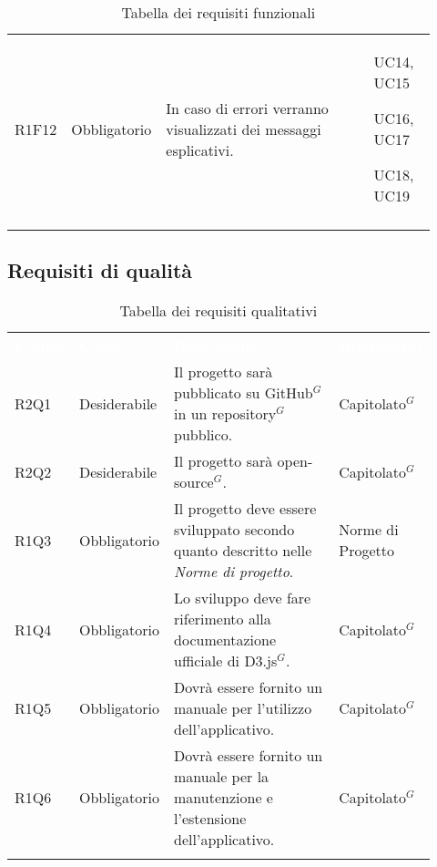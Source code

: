 {\begin{longtable}{p{0.12\linewidth}p{0.15\linewidth}p{0.50\linewidth}p{0.15\linewidth}}
    \rowcolor[RGB]{216, 235, 171}
    R1F12 & Obbligatorio & In caso di errori verranno visualizzati dei messaggi esplicativi. & UC14, UC15 \par UC16, UC17 \par UC18, UC19\\

    \caption{Tabella dei requisiti funzionali}

\end{longtable}
}


\subsection{Requisiti di qualità}
{\renewcommand{\arraystretch}{1.5}
\begin{longtable}{p{0.12\linewidth}p{0.15\linewidth}p{0.50\linewidth}p{0.15\linewidth}}
	\rowcolor[RGB]{33, 73, 50}
	\textcolor{white}{\textbf{Codice}} & \textcolor{white}{\textbf{Classe}} & \textcolor{white}{\textbf{Descrizione}} &
    \textcolor{white}{\textbf{Riferimenti}}\\

    \rowcolor[RGB]{216, 235, 171}
    R2Q1 & Desiderabile & Il progetto sarà pubblicato su GitHub$^{G}$ in un repository$^{G}$ pubblico. & Capitolato$^{G}$\\
    \rowcolor[RGB]{233, 245, 206}
    R2Q2 & Desiderabile & Il progetto sarà open-source$^{G}$. & Capitolato$^{G}$\\
    \rowcolor[RGB]{216, 235, 171}
    R1Q3 & Obbligatorio & Il progetto deve essere sviluppato secondo quanto descritto nelle \textit{Norme di progetto}. & Norme di Progetto\\
    \rowcolor[RGB]{233, 245, 206}
    R1Q4 & Obbligatorio & Lo sviluppo deve fare riferimento alla documentazione ufficiale di D3.js$^{G}$. & Capitolato$^{G}$\\
    \rowcolor[RGB]{216, 235, 171}
    R1Q5 & Obbligatorio & Dovrà essere fornito un manuale per l'utilizzo dell'applicativo. & Capitolato$^{G}$\\
    \rowcolor[RGB]{233, 245, 206}
    R1Q6 & Obbligatorio & Dovrà essere fornito un manuale per la manutenzione e l'estensione dell'applicativo. & Capitolato$^{G}$\\

    \caption{Tabella dei requisiti qualitativi}
\end{longtable}
}

